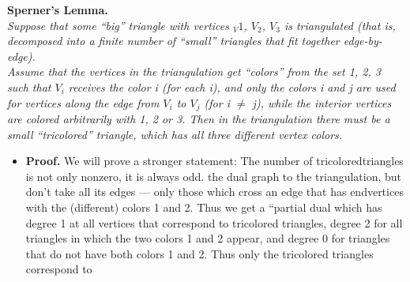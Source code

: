 \documentclass[10pt,twoside]{book}
\begin{document}
		\textbf{Sperner's Lemma.}\\
		\textit{Suppose that some “big” triangle with vertices $_V1$, $V_2$, $V_3$ is triangulated (that is, decomposed into a ﬁnite number of “small” triangles that ﬁt together edge-by-edge).\\
		Assume that the vertices in the triangulation get “colors” from the set {1, 2, 3} such that $V_i$ receives the color i (for each i), and only the colors i and j are used for vertices along the edge from $V_i$ to $V_j$ (for i $\neq$ j), while the interior vertices are colored arbitrarily with 1, 2 or 3. Then in the triangulation there must be a small “tricolored” triangle, which has all three different vertex colors.}
			\begin{itemize}
				\item[\textcolor{black}{\rule{1ex}{1ex}}] \textbf{Proof.} We will prove a stronger statement: The number of tricoloredtriangles is not only nonzero, it is always odd.  the dual graph to the triangulation, but don’t take all its edges — only those which cross an edge that has endvertices with the (different) 	colors 1 and 2. Thus we get a “partial dual which has degree 1 at all vertices that correspond to tricolored triangles, degree 2 for all triangles in which the two colors 1 and 2 appear, and degree 0 for triangles that do not have both colors 1 and 2. Thus only the tricolored triangles correspond to

\end{itemize}
\end{document}
